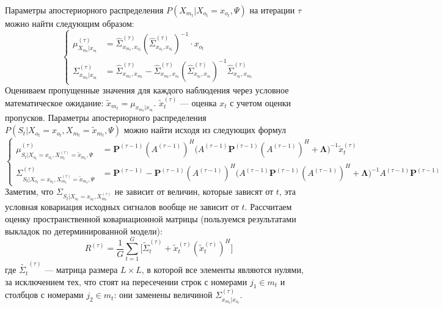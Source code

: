 \documentclass[11pt]{article}
\begin{document}
Параметры апостериорного распределения $P(X_{m_t}|X_{o_t}=x_{o_t},\Psi)$ на итерации $\tau$ можно найти следующим образом:
\begin{equation}
\left\{ \begin{aligned} 
\mu_{X_{m_t}|x_{o_t}}^{(\tau)} &= \hat{\Sigma}_{x_{m_t},x_{o_t}}^{(\tau)}(\hat{\Sigma}_{x_{o_t},x_{o_t}}^{(\tau)})^{-1}\cdot x_{o_t} \\
\Sigma_{x_{m_t}|x_{o_t}}^{(\tau)} &= \hat{\Sigma}_{x_{m_t},x_{m_t}}^{(\tau)}-\hat{\Sigma}_{x_{m_t},x_{o_t}}^{(\tau)}(\hat{\Sigma}_{x_{o_t},x_{o_t}}^{(\tau)})^{-1}\hat{\Sigma}_{x_{o_t},x_{m_t}}^{(\tau)}
\end{aligned} \right.
\end{equation}
Оцениваем пропущенные значения для каждого наблюдения через условное математическое ожидание:
$\widetilde{x}_{m_t} = \mu_{x_{m_t}|x_{o_t}}$. $\widetilde{x}_t^{(\tau)}$ --- оценка $x_t$ с учетом оценки пропусков.
Параметры апостериорного распределения $P(S_t|X_{o_t} = x_{o_t}, X_{m_t} = \widetilde{x}_{m_t}, \Psi)$ можно найти исходя из следующих формул
\begin{equation}
\left\{ \begin{aligned} 
\mu_{S_t|X_{o_t} = x_{o_t}, X_{m_t}^{(\tau)} = \widetilde{x}_{m_t}, \Psi}^{(\tau)} &= \mathbf{P}^{(\tau-1)}(A^{(\tau-1)})^H\Big(A^{(\tau-1)}\mathbf{P}^{(\tau-1)}(A^{(\tau-1)})^H+\mathbf{\Lambda}\Big)^{-1}\widetilde{x}_t^{(\tau)} \\
\Sigma_{S_t|X_{o_t} = x_{o_t}, X_{m_t}^{(\tau)} = \widetilde{x}_{m_t}, \Psi}^{(\tau)} &= \mathbf{P}^{(\tau-1)} - \mathbf{P}^{(\tau-1)}(A^{(\tau-1)})^H\Big(A^{(\tau-1)}\mathbf{P}^{(\tau-1)}(A^{(\tau-1)})^H+\mathbf{\Lambda}\Big)^{-1}A^{(\tau-1)}\mathbf{P}^{(\tau-1)}
\end{aligned} \right.
\end{equation}
Заметим, что $\Sigma_{S_t|X_{o_t} = x_{o_t}, X_{m_t}^{(\tau)}}$ не зависит от величин, которые зависят от $t$, эта условная ковариация исходных сигналов вообще не зависит от $t$.
Рассчитаем оценку пространственной ковариационной матрицы (пользуемся результатами выкладок по детерминированной модели):
\begin{equation}
{R}^{(\tau)} = \frac{1}{G} \sum_{t = 1}^{G} \Big[ \widetilde{\Sigma}_{t}^{(\tau)} + \widetilde{x}_t^{(\tau)}(\widetilde{x}_t^{(\tau)})^H \Big]
\end{equation}
где $\widetilde{\Sigma_{t}}^{(\tau)}$ --- матрица размера $L \times L$, в которой все элементы являются нулями, за исключением тех, что стоят на пересечении строк с номерами $j_1 \in m_t$ и столбцов с номерами $j_2 \in m_t$: они заменены величиной $\Sigma^{(\tau)}_{x_{m_t}|x_{o_t}}$.
\end{document}
